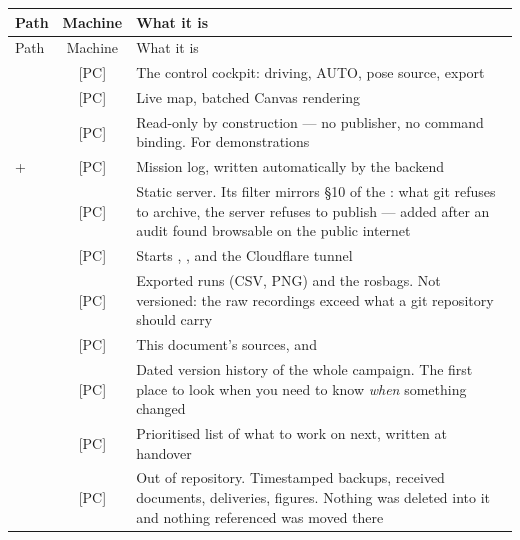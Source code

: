 \begin{longtable}{@{}L{4.4cm}cL{7.6cm}@{}}
\toprule
Path & Machine & What it is \\
\midrule
\endfirsthead
\toprule
Path & Machine & What it is \\
\midrule
\endhead
{} & [PC] &
  The control cockpit: driving, AUTO, pose source, export \\
\addlinespace
{} & [PC] &
  Live map, batched Canvas rendering \\
\addlinespace
{} & [PC] &
  Read-only by construction --- no publisher, no command binding. For
  demonstrations \\
\addlinespace
{} +  & [PC] &
  Mission log, written automatically by the backend \\
\addlinespace
{} & [PC] &
  Static server. Its filter mirrors \S10 of the : what git
  refuses to archive, the server refuses to publish --- added after an audit
  found  browsable on the public internet \\
\addlinespace
{} & [PC] &
  Starts , ,  and the
  Cloudflare tunnel \\
\addlinespace
{} & [PC] &
  Exported runs (CSV, PNG) and the rosbags. Not versioned: the raw
  recordings exceed what a git repository should carry \\
\addlinespace
{} & [PC] &
  This document's sources, and  \\
\addlinespace
{} & [PC] &
  Dated version history of the whole campaign. The first place to look when
  you need to know \emph{when} something changed \\
\addlinespace
{} & [PC] &
  Prioritised list of what to work on next, written at handover \\
\addlinespace
{} & [PC] &
  Out of repository. Timestamped backups, received documents, deliveries,
  figures. Nothing was deleted into it and nothing referenced was moved
  there \\
\bottomrule
\end{longtable}

